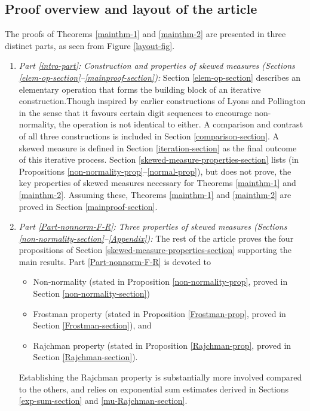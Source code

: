 \documentclass[12pt, twoside]{article}
\theoremstyle{definition}
\numberwithin{equation}{section}
\begin{document}
\subsection{Proof overview and layout of the article} \label{proof-overview-section}
The proofs of Theorems \ref{mainthm-1} and \ref{mainthm-2} are presented in three distinct parts, as seen from Figure \ref{layout-fig}. 
\begin{enumerate}[1.]
\item {\em{Part \ref{intro-part}: Construction and properties of skewed measures (Sections \ref{elem-op-section}--\ref{mainproof-section}):}} Section \ref{elem-op-section} describes an elementary operation that forms the building block of an iterative construction.Though inspired by earlier constructions of Lyons \cite{l86} and Pollington \cite{p81} in the sense that it favours certain digit sequences to encourage non-normality, the operation is not identical to either. A comparison and contrast of all three constructions is included in Section \ref{comparison-section}. A skewed measure is defined in Section \ref{iteration-section} as the final outcome of this iterative process. Section \ref{skewed-measure-properties-section} lists (in Propositions \ref{non-normality-prop}--\ref{normal-prop}), but does not prove, the key properties of skewed measures necessary for Theorems \ref{mainthm-1} and \ref{mainthm-2}. Assuming these, Theorems \ref{mainthm-1} and \ref{mainthm-2} are proved in Section \ref{mainproof-section}.
\item {\em{Part \ref{Part-nonnorm-F-R}: Three properties of skewed measures (Sections \ref{non-normality-section}--\ref{Appendix}):}} The rest of the article proves the four propositions of Section \ref{skewed-measure-properties-section} supporting the main results. Part \ref{Part-nonnorm-F-R} is devoted to
\begin{itemize} 
\item Non-normality (stated in Proposition \ref{non-normality-prop}, proved in Section \ref{non-normality-section})
\item Frostman property (stated in Proposition \ref{Frostman-prop}, proved in Section \ref{Frostman-section}), and 
\item Rajchman property (stated in Proposition \ref{Rajchman-prop}, proved in Section \ref{Rajchman-section}).  
\end{itemize}    
Establishing the Rajchman property is substantially more involved compared to the others, and relies on exponential sum estimates derived in Sections \ref{exp-sum-section} and \ref{mu-Rajchman-section}. 

\end{enumerate}
\end{document}
